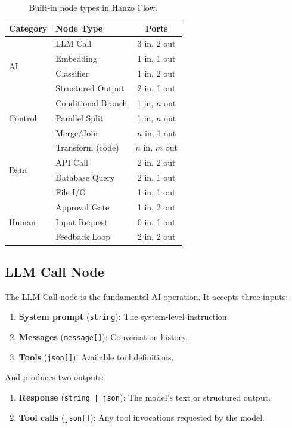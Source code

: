 \begin{table}[H]
\centering
\small
\begin{tabular}{llc}
\toprule
\textbf{Category} & \textbf{Node Type} & \textbf{Ports} \\
\midrule
\multirow{4}{*}{AI} & LLM Call & 3 in, 2 out \\
& Embedding & 1 in, 1 out \\
& Classifier & 1 in, 2 out \\
& Structured Output & 2 in, 1 out \\
\midrule
\multirow{3}{*}{Control} & Conditional Branch & 1 in, $n$ out \\
& Parallel Split & 1 in, $n$ out \\
& Merge/Join & $n$ in, 1 out \\
\midrule
\multirow{4}{*}{Data} & Transform (code) & $n$ in, $m$ out \\
& API Call & 2 in, 2 out \\
& Database Query & 2 in, 1 out \\
& File I/O & 1 in, 1 out \\
\midrule
\multirow{3}{*}{Human} & Approval Gate & 1 in, 2 out \\
& Input Request & 0 in, 1 out \\
& Feedback Loop & 2 in, 2 out \\
\bottomrule
\end{tabular}
\caption{Built-in node types in Hanzo Flow.}
\label{tab:nodes}
\end{table}

\subsection{LLM Call Node}

The LLM Call node is the fundamental AI operation. It accepts three inputs:

\begin{enumerate}[leftmargin=1.4em]
    \item \textbf{System prompt} (\texttt{string}): The system-level instruction.
    \item \textbf{Messages} (\texttt{message[]}): Conversation history.
    \item \textbf{Tools} (\texttt{json[]}): Available tool definitions.
\end{enumerate}

And produces two outputs:
\begin{enumerate}[leftmargin=1.4em]
    \item \textbf{Response} (\texttt{string | json}): The model's text or structured output.
    \item \textbf{Tool calls} (\texttt{json[]}): Any tool invocations requested by the model.
\end{enumerate}

